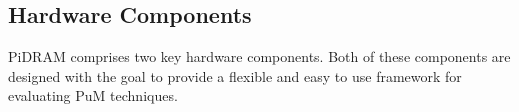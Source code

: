 


\subsection{Hardware Components}
\label{sec:hardware-components}


{PiDRAM comprises two key hardware components. Both of these components are designed with the goal to provide a flexible and easy to use framework for evaluating PuM techniques.}


